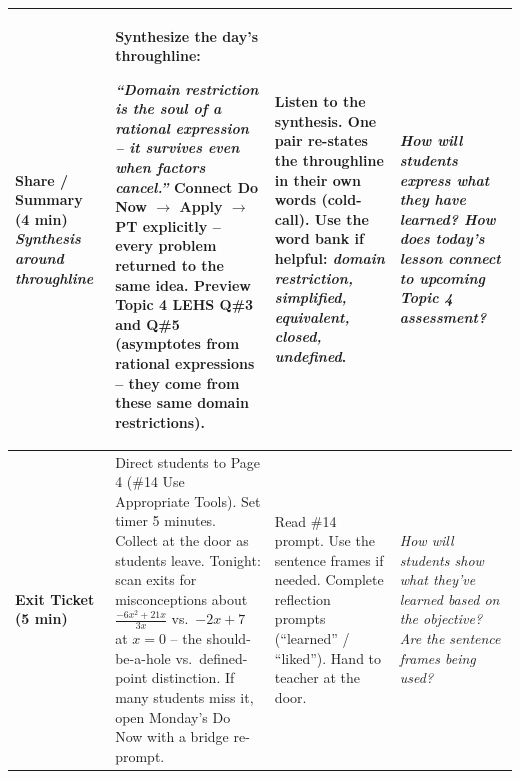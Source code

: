 \documentclass[10pt]{article}
\begin{document}
\begin{xltabular}{\linewidth}{|>{\bfseries\RaggedRight\arraybackslash}p{1.4in}|Y|>{\RaggedRight\arraybackslash}p{1.9in}|>{\itshape\RaggedRight\arraybackslash}p{1.55in}|}
  Share / Summary (4 min) \newline
  \emph{Synthesis around throughline}
  &
  Synthesize the day's throughline: \par
  \emph{``Domain restriction is the soul of a rational expression --
  it survives even when factors cancel.''}     \newline
  Connect Do Now $\rightarrow$ Apply $\rightarrow$ PT explicitly --
  every problem returned to the same idea.     \newline
  Preview Topic 4 LEHS Q\#3 and Q\#5 (asymptotes from rational
  expressions -- they come from these same domain restrictions).
  &
  Listen to the synthesis.     \newline
  One pair re-states the throughline in their own words (cold-call).     \newline
  Use the word bank if helpful: \emph{domain restriction, simplified,
  equivalent, closed, undefined}.
  &
  How will students express what they have learned?     \newline
  How does today's lesson connect to upcoming Topic 4 assessment? \\ \hline

  Exit Ticket (5 min)
  &
  Direct students to Page 4 (\#14 Use Appropriate Tools).
  Set timer 5 minutes.
  Collect at the door as students leave.     \newline
  Tonight: scan exits for misconceptions about
  $\frac{-6x^2+21x}{3x}$ vs.\ $-2x + 7$ at $x = 0$ -- the should-be-a-hole
  vs.\ defined-point distinction. If many students miss it, open Monday's
  Do Now with a bridge re-prompt.
  &
  Read \#14 prompt.     \newline
  Use the sentence frames if needed.     \newline
  Complete reflection prompts (``learned'' / ``liked'').     \newline
  Hand to teacher at the door.
  &
  How will students show what they've learned based on the objective?     \newline
  Are the sentence frames being used? \\ \hline
\end{xltabular}
\end{document}

